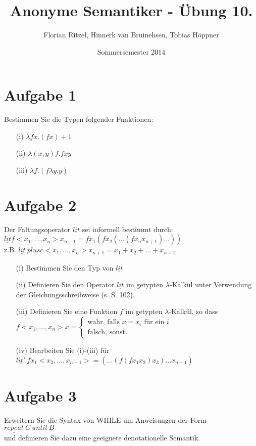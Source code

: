 \documentclass[ngerman,a4paper]{report}
\author{Florian Ritzel, Hinnerk van Bruinehsen, Tobias Höppner}
\title{Anonyme Semantiker - Übung 10. }
\date{Sommersemester 2014}
\renewcommand{\maketitle}{}
\begin{document}
\maketitle
\section*{Aufgabe 1}
Bestimmen Sie die Typen folgender Funktionen:
\begin{itemize}
\item[(i)]$\lambda fx.(fx)+1$
\item[(ii)] $\lambda(x,y)f.fxy$
\item[(iii)] $\lambda f.(f\lambda y.y)$
\end{itemize}

\section*{Aufgabe 2}
Der Faltungsoperator $\underline{lit}$ sei informell bestimmt durch:
$\underline{lit} f<x_1,\dots,x_n>x_{n+1} = fx_1(fx_2(\dots(fx_n x_{n+1})\dots))$\\
z.B. $\underline{lit} \ \underline{plusc}<x_1,\dots,x_n>x_{n+1} = x_1 + x_2 + \dots + x_{n+1}$\\
\begin{itemize}
\item[(i)] Bestimmen Sie den Typ von $\underline{lit}$
\item[(ii)] Definieren Sie den Operator $\underline{lit}$ im getypten $\lambda$-Kalkül unter Verwendung der Gleichungsschreibweise (s. S. 102).
\item[(iii)] Definieren Sie eine Funktion $f$ im getypten $\lambda$-Kalkül, so dass\\
$
f<x_1,\dots,x_n>x=\begin{cases}
\text{wahr, falls } x=x_i \text{ für ein } i\\
\text{falsch, sonst.}
\end{cases}
$
\item[(iv)] Bearbeiten Sie (i)-(iii) für $\underline{lit'}\ fx_1<x_2,\dots,x_{n+1}>=(\dots(f(fx_1 x_2)x_3)\dots x_{n+1})$ 
\end{itemize}

\section*{Aufgabe 3}
Erweitern Sie die Syntax von WHILE um Anweisungen der Form\\
$\underline{repeat}\ C\ \underline{until}\ B$\\
und definieren Sie dazu eine geeignete denotationelle Semantik.
\end{document}
